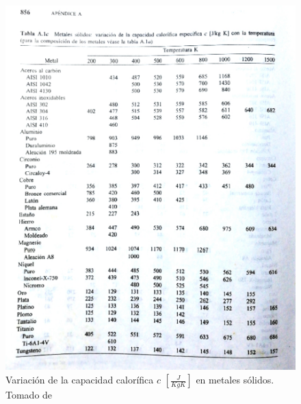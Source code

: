 \documentclass[12pt,letterpaper]{article}     %
\begin{document}
\begin{figure}[H]
\centering
\includegraphics[width=1.2\textwidth]{Imagines/Varcapacalorifica.png}
\caption{Variación de la capacidad calorífica $c$ $[\frac{J}{KgK}]$ en metales sólidos. Tomado de \cite[p\ 856]{Mills}}
\label{fig:variacioncalorifica}
\end{figure}
\end{document}
